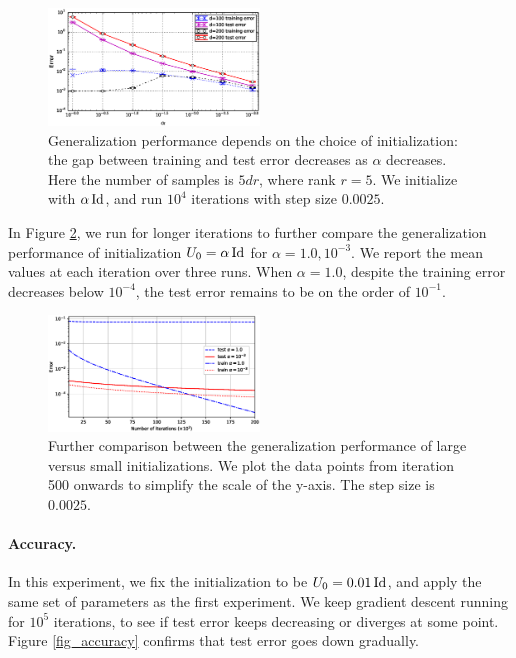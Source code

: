 \begin{figure}[!ht]
	\centering
	\includegraphics[width=0.5\textwidth]{compare_init.eps}
	\caption{Generalization performance depends on the choice of initialization:
	the gap between training and test error decreases as $\alpha$ decreases.
	Here the number of samples is $5dr$, where rank $r = 5$. We initialize with
	$\alpha \operatorname{Id}$, and run $10^4$ iterations with step size $0.0025$.}
	\label{fig_init}
\end{figure}

In Figure \ref{fig_init_long}, we run for longer iterations to further compare the generalization performance of initialization $U_0 = \alpha\operatorname{Id}$ for $\alpha = 1.0, 10^{-3}$.
We report the mean values at each iteration over three runs.
When $\alpha = 1.0$, despite the training error decreases below $10^{-4}$,
the test error remains to be on the order of $10^{-1}$.

\begin{figure}[!ht]
	\centering
	\includegraphics[width=0.5\textwidth]{compare_init_long_step.eps}
	\caption{Further comparison between the generalization performance of large versus small initializations. We plot the data points from iteration 500 onwards to simplify the scale of the y-axis. The step size is $0.0025$.}
	\label{fig_init_long}
\end{figure}



\paragraph{Accuracy.}
In this experiment, we fix the initialization to be $U_0 = 0.01 \operatorname{Id}$,
and apply the same set of parameters as the first experiment.
We keep gradient descent running for $10^5$ iterations, to see if test error
keeps decreasing or diverges at some point.
Figure \ref{fig_accuracy} confirms that test error goes down gradually.

